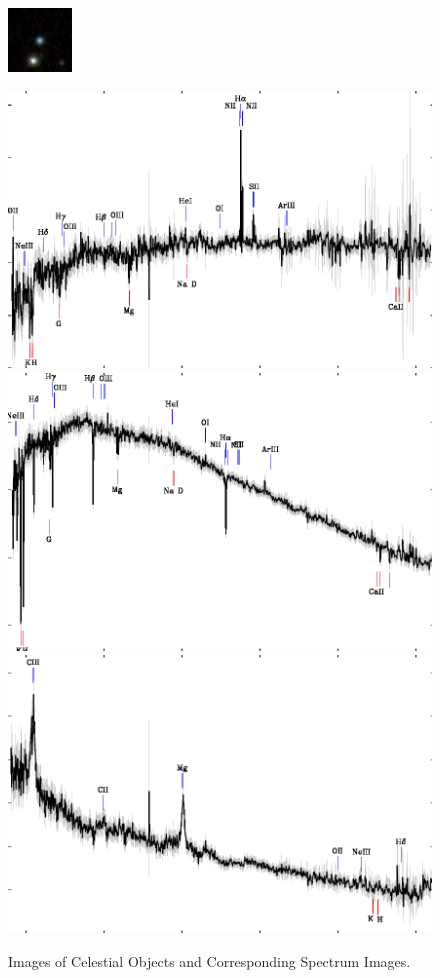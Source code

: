 \documentclass[
  11pt,
]{article}
\begin{document}
\begin{figure}
\begin{minipage}{0.8\textwidth}
\includegraphics[width=\linewidth]{./data/QSO/QSO_1.jpg}

\end{minipage}
\end{figure}

\begin{figure}
\centering
\begin{minipage}{\textwidth}
\centering
\includegraphics[width=0.3\linewidth]{./data/GALAXY_spec/GALAXY_spectrum_1.jpg}\hfill
\includegraphics[width=0.3\linewidth]{./data/STAR_spec/STAR_spectrum_1.jpg}\hfill
\includegraphics[width=0.3\linewidth]{./data/QSO_spec/QSO_spectrum_1.jpg}
\caption{Images of Celestial Objects and Corresponding Spectrum Images.}
\label{fig:data_images}
\end{minipage}
\end{figure}
\end{document}
